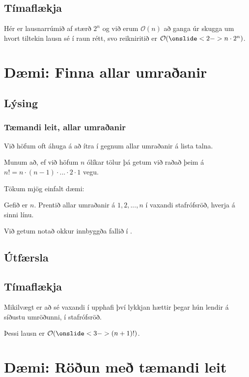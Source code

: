 \subsection{Tímaflækja}
{
    {
        \item<1-> Hér er lausnarrúmið af stærð $2^n$ og við erum $\mathcal{O}(n)$ að ganga úr skugga um hvort tiltekin lausn sé í raun rétt,
            svo reikniritið er $\mathcal{O}(\onslide<2->{n \cdot 2^n})$.
    }
}

\section{Dæmi: Finna allar umraðanir}
\subsection{Lýsing}
{
    \frametitle{Tæmandi leit, allar umraðanir}
    {
        \item<1-> Við höfum oft áhuga á að ítra í gegnum allar umraðanir á lista talna.
        \item<2-> Munum að, ef við höfum $n$ ólíkar tölur þá getum við raðað þeim á $n! = n \cdot (n - 1) \cdot ... \cdot 2 \cdot 1$ vegu.
        \item<3-> Tökum mjög einfalt dæmi:
        \item<4-> Gefið er $n$. Prentið allar umraðanir á $1, 2, ..., n$ í vaxandi stafrófsröð, hverja á sinni línu.
        \item<5-> Við getum notað okkur innbyggða fallið  í .
    }
}

\subsection{Útfærsla}
{
}

\subsection{Tímaflækja}
{
    {
        \item<1-> Mikilvægt er að  sé vaxandi í upphafi því lykkjan hættir þegar hún lendir á síðustu umröðunni, í stafrófsröð.
        \item<2-> Þessi lausn er $\mathcal{O}(\onslide<3->{(n + 1)!})$.
    }
}

\section{Dæmi: Röðun með tæmandi leit}
